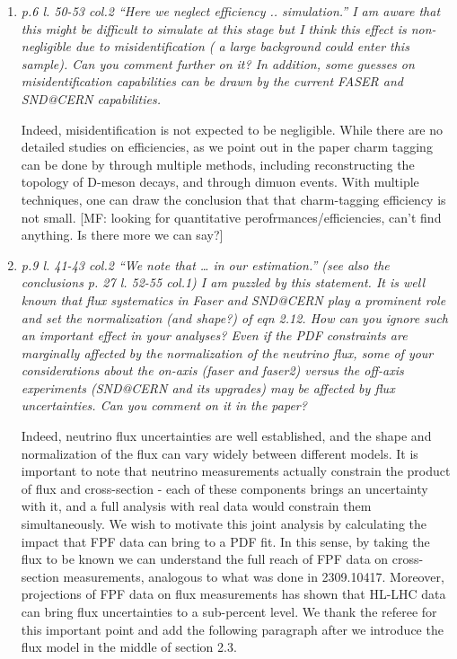 \documentclass[11pt,a4paper]{article}
\begin{document}
\begin{enumerate}
\item{\it p.6 l. 50-53 col.2 “Here we neglect efficiency .. simulation.” I am aware that this might be difficult to simulate at this stage but I think this effect is non-negligible due to misidentification ( a large background could enter this sample). Can you comment further on it? In addition, some guesses on misidentification capabilities can be drawn by the current FASER and SND@CERN capabilities.}

Indeed, misidentification is not expected to be negligible. While there are no detailed studies on efficiencies, as we point out in the paper charm tagging can be done by through multiple methods, including reconstructing the topology of D-meson decays, and through dimuon events. With multiple techniques, one can draw the conclusion that that charm-tagging efficiency is not small.
{\color {red} [MF: looking for quantitative perofrmances/efficiencies, can't find anything. Is there more we can say?]}

\item{\it p.9 l. 41-43 col.2 “We note that … in our estimation.” (see also the conclusions p. 27 l. 52-55 col.1) I am puzzled by this statement. It is well known that flux systematics in Faser and SND@CERN play a prominent role and set the normalization (and shape?) of eqn 2.12. How can you ignore such an important effect in your analyses? Even if the PDF constraints are marginally affected by the normalization of the neutrino flux, some of your considerations about the on-axis (faser and faser2) versus the off-axis experiments (SND@CERN and its upgrades) may be affected by flux uncertainties. Can you comment on it in the paper?}

Indeed, neutrino flux uncertainties are well established, and the shape and normalization of the flux can vary widely between different models. It is important to note that neutrino measurements actually constrain the product of flux and cross-section - each of these components brings an uncertainty with it, and a full analysis with real data would constrain them simultaneously. We wish to motivate this joint analysis by calculating the  impact that FPF data can bring to a PDF fit. In this sense, by taking the flux to be known we can understand the full reach of FPF data on cross-section measurements, analogous to what was done in 2309.10417. Moreover, projections of FPF data on flux measurements has shown that HL-LHC data can bring flux uncertainties to a sub-percent level. We thank the referee for this important point and add the following paragraph after we introduce the flux model in the middle of section 2.3. 


\end{enumerate}
\end{document}
